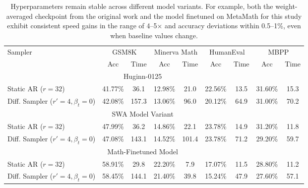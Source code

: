 \documentclass{article} %
\theoremstyle{definition}
\theoremstyle{plain}
\begin{document}
\begin{table}[t]
\vspace{-1em}
\centering
\small 
\begin{tabular}{l*{8}{c}}
\toprule
\multirow{2}{*}{Sampler} & \multicolumn{2}{c}{GSM8K} & \multicolumn{2}{c}{Minerva Math} & \multicolumn{2}{c}{HumanEval} & \multicolumn{2}{c}{MBPP}  \\
\cmidrule(lr){2-3} \cmidrule(lr){4-5} \cmidrule(lr){6-7} \cmidrule(lr){8-9}
& Acc & Time & Acc & Time & Acc & Time & Acc & Time \\
\midrule
\multicolumn{8}{c}{Huginn-0125} \\
\midrule
Static AR ({\tiny$r=32$})  & 41.77\% & 36.1 & 12.98\% & 21.0 & 22.56\% & 13.5 & 31.60\% & 15.3 \\ %
Diff. Sampler ({\tiny$r'=4,\beta_t=0$})  & 42.08\% & 157.3 & 13.06\% & 96.0 & 20.12\% & 64.9 & 31.00\% & 70.2 \\ %
\midrule
\multicolumn{8}{c}{SWA Model Variant} \\
\midrule
Static AR ({\tiny$r=32$})  & 47.99\% & 36.2 & 14.86\% & 22.1 & 23.78\% & 14.9 & 31.20\% & 11.8 \\ %
Diff. Sampler ({\tiny$r'=4,\beta_t=0$})  & 47.08\% & 143.1 & 14.52\% & 101.4 & 23.78\% & 71.2 & 29.20\% & 59.7 \\ %
\midrule
\multicolumn{8}{c}{Math-Finetuned Model} \\
\midrule
Static AR ({\tiny$r=32$})  & 58.91\% & 29.8 & 22.20\% & 7.9 & 17.07\% & 11.5 & 28.80\% & 11.2 \\ %
Diff. Sampler ({\tiny$r'=4,\beta_t=0$}) & 58.45\% & 144.1 & 21.40\% & 39.8 & 15.24\% & 47.9 & 27.60\% & 57.1 \\ %
\bottomrule
\end{tabular}
\caption{Hyperparameters remain stable across different model variants. For example, both the weight-averaged checkpoint from the original work and the model finetuned on MetaMath for this study exhibit consistent speed gains in the range of 4–5× and accuracy deviations within 0.5–1\%, even when baseline values change.
}
\label{tab:sampler_comparison_2}
\end{table}
\end{document}
